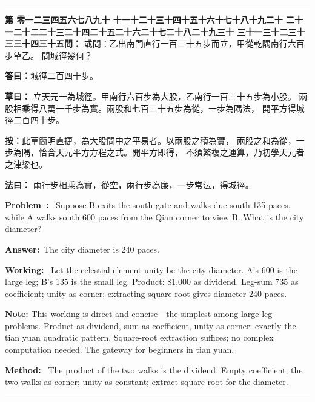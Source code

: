 \documentclass[9pt,a4paper]{article}
\newcounter{probnum}
\newcounter{overallnum}
\newcommand{\chnum}[1]{%
  \ifcase#1 零\or 一\or 二\or 三\or 四\or 五\or 六\or 七\or 八\or 九\or 十\or
    十一\or 十二\or 十三\or 十四\or 十五\or 十六\or 十七\or 十八\or 十九\or 二十\or
    二十一\or 二十二\or 二十三\or 二十四\or 二十五\or 二十六\or 二十七\or 二十八\or 二十九\or 三十\or
    三十一\or 三十二\or 三十三\or 三十四\or 三十五\fi}
\newcommand{\problem}[1]{\stepcounter{probnum}\stepcounter{overallnum}\par\noindent\textbf{\color{volcolor}第\chnum{\value{probnum}}問：}#1\par\vspace{0.15cm}}
\newcommand{\answer}[1]{\par\noindent\textbf{答曰：}#1\par\vspace{0.15cm}}
\newcommand{\working}[1]{\par\noindent\textbf{草曰：}#1\par\vspace{0.15cm}}
\newcommand{\method}[1]{\par\noindent\textbf{法曰：}#1\par\vspace{0.25cm}}
\newcommand{\eproblem}[1]{\par\noindent\textbf{\color{volcolor}Problem~\theoverallnum:}~#1\par\vspace{0.15cm}}
\newcommand{\eanswer}[1]{\par\noindent\textbf{Answer:}~#1\par\vspace{0.15cm}}
\newcommand{\eworking}[1]{\par\noindent\textbf{Working:}~#1\par\vspace{0.15cm}}
\newcommand{\emethod}[1]{\par\noindent\textbf{Method:}~#1\par\vspace{0.25cm}}
\begin{document}
\vspace{0.15cm}
\noindent\rule{\textwidth}{0.2pt}
\vspace{0.15cm}

\noindent\begin{minipage}[t]{0.48\textwidth}
\problem{
或問：乙出南門直行一百三十五步而立，甲從乾隅南行六百步望乙。
問城徑幾何？
}

\answer{城徑二百四十步。}

\working{
立天元一為城徑。甲南行六百步為大股，乙南行一百三十五步為小股。
兩股相乘得八萬一千步為實。兩股和七百三十五步為從，一步為隅法，
開平方得城徑二百四十步。

\textbf{按：}此草簡明直捷，為大股問中之平易者。以兩股之積為實，
兩股之和為從，一步為隅，恰合天元平方方程之式。開平方即得，
不須繁複之運算，乃初學天元者之津梁也。
}

\method{
兩行步相乘為實，從空，兩行步為廉，一步常法，得城徑。
}
\end{minipage}%
\hfill%
\begin{minipage}[t]{0.50\textwidth}
\eproblem{
Suppose B exits the south gate and walks due south 135 paces, while A walks
south 600 paces from the Qian corner to view B. What is the city diameter?
}

\eanswer{The city diameter is 240 paces.}

\eworking{
Let the celestial element unity be the city diameter. A's 600 is the large
leg; B's 135 is the small leg. Product: 81,000 as dividend. Leg-sum 735 as
coefficient; unity as corner; extracting square root gives diameter 240 paces.

\textbf{Note:} This working is direct and concise---the simplest among large-leg
problems. Product as dividend, sum as coefficient, unity as corner: exactly
the tian yuan quadratic pattern. Square-root extraction suffices; no complex
computation needed. The gateway for beginners in tian yuan.
}

\emethod{
The product of the two walks is the dividend. Empty coefficient; the two
walks as corner; unity as constant; extract square root for the diameter.
}
\end{minipage}
\vspace{0.15cm}

\vspace{0.15cm}
\noindent\rule{\textwidth}{0.2pt}
\vspace{0.15cm}
\end{document}

